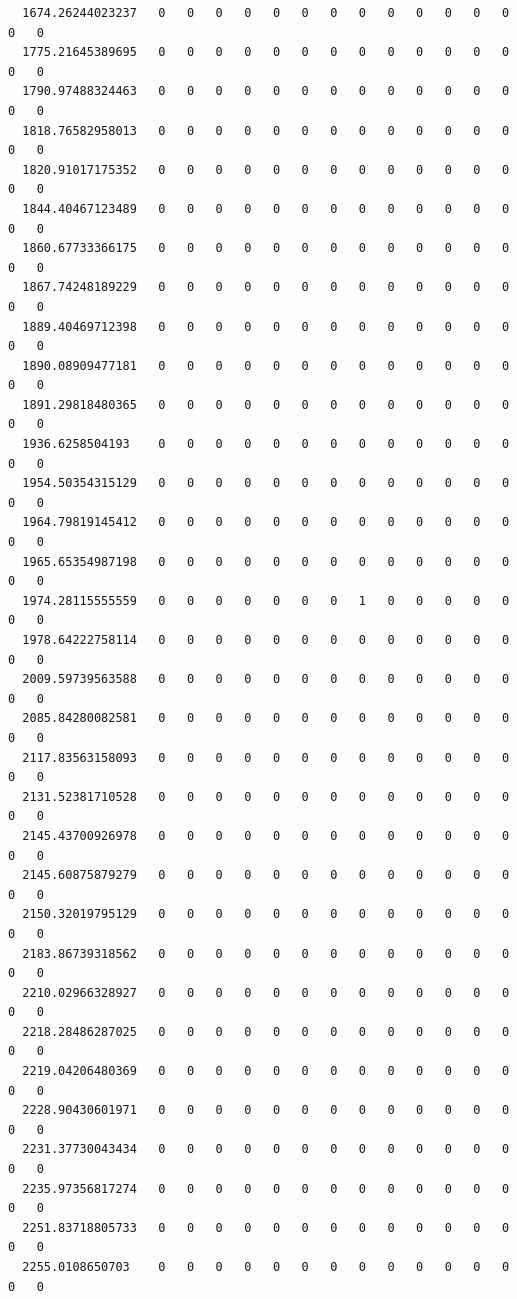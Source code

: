 \documentclass[
  letterpaper,
  DIV=11,
  numbers=noendperiod]{scrartcl}
\begin{document}
\begin{verbatim}
  1674.26244023237   0   0   0   0   0   0   0   0   0   0   0   0   0   0   0
  1775.21645389695   0   0   0   0   0   0   0   0   0   0   0   0   0   0   0
  1790.97488324463   0   0   0   0   0   0   0   0   0   0   0   0   0   0   0
  1818.76582958013   0   0   0   0   0   0   0   0   0   0   0   0   0   0   0
  1820.91017175352   0   0   0   0   0   0   0   0   0   0   0   0   0   0   0
  1844.40467123489   0   0   0   0   0   0   0   0   0   0   0   0   0   0   0
  1860.67733366175   0   0   0   0   0   0   0   0   0   0   0   0   0   0   0
  1867.74248189229   0   0   0   0   0   0   0   0   0   0   0   0   0   0   0
  1889.40469712398   0   0   0   0   0   0   0   0   0   0   0   0   0   0   0
  1890.08909477181   0   0   0   0   0   0   0   0   0   0   0   0   0   0   0
  1891.29818480365   0   0   0   0   0   0   0   0   0   0   0   0   0   0   0
  1936.6258504193    0   0   0   0   0   0   0   0   0   0   0   0   0   0   0
  1954.50354315129   0   0   0   0   0   0   0   0   0   0   0   0   0   0   0
  1964.79819145412   0   0   0   0   0   0   0   0   0   0   0   0   0   0   0
  1965.65354987198   0   0   0   0   0   0   0   0   0   0   0   0   0   0   0
  1974.28115555559   0   0   0   0   0   0   0   1   0   0   0   0   0   0   0
  1978.64222758114   0   0   0   0   0   0   0   0   0   0   0   0   0   0   0
  2009.59739563588   0   0   0   0   0   0   0   0   0   0   0   0   0   0   0
  2085.84280082581   0   0   0   0   0   0   0   0   0   0   0   0   0   0   0
  2117.83563158093   0   0   0   0   0   0   0   0   0   0   0   0   0   0   0
  2131.52381710528   0   0   0   0   0   0   0   0   0   0   0   0   0   0   0
  2145.43700926978   0   0   0   0   0   0   0   0   0   0   0   0   0   0   0
  2145.60875879279   0   0   0   0   0   0   0   0   0   0   0   0   0   0   0
  2150.32019795129   0   0   0   0   0   0   0   0   0   0   0   0   0   0   0
  2183.86739318562   0   0   0   0   0   0   0   0   0   0   0   0   0   0   0
  2210.02966328927   0   0   0   0   0   0   0   0   0   0   0   0   0   0   0
  2218.28486287025   0   0   0   0   0   0   0   0   0   0   0   0   0   0   0
  2219.04206480369   0   0   0   0   0   0   0   0   0   0   0   0   0   0   0
  2228.90430601971   0   0   0   0   0   0   0   0   0   0   0   0   0   0   0
  2231.37730043434   0   0   0   0   0   0   0   0   0   0   0   0   0   0   0
  2235.97356817274   0   0   0   0   0   0   0   0   0   0   0   0   0   0   0
  2251.83718805733   0   0   0   0   0   0   0   0   0   0   0   0   0   0   0
  2255.0108650703    0   0   0   0   0   0   0   0   0   0   0   0   0   0   0

\end{verbatim}
\end{document}
